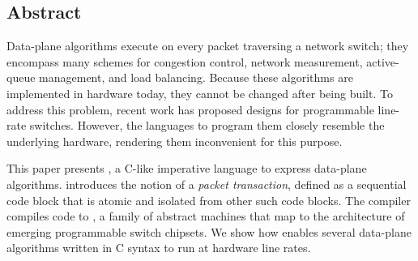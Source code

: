 \subsection*{Abstract}
Data-plane algorithms execute on every packet traversing a network switch; they
encompass many schemes for congestion control, network measurement,
active-queue management, and load balancing. Because these algorithms are
implemented in hardware today, they cannot be changed after being built. To
address this problem, recent work has proposed designs for programmable
line-rate switches.  However, the languages to program them closely resemble
the underlying hardware, rendering them inconvenient for this purpose.

This paper presents \pktlanguage, a C-like imperative language to express
data-plane algorithms. \pktlanguage introduces the notion of a {\em packet
transaction}, defined as a sequential code block that is atomic and isolated
from other such code blocks.  The \pktlanguage compiler compiles \pktlanguage
code to \absmachine, a family of abstract machines that map to the architecture
of emerging programmable switch chipsets. We show how \pktlanguage enables
several data-plane algorithms written in C syntax to run at hardware line
rates.

